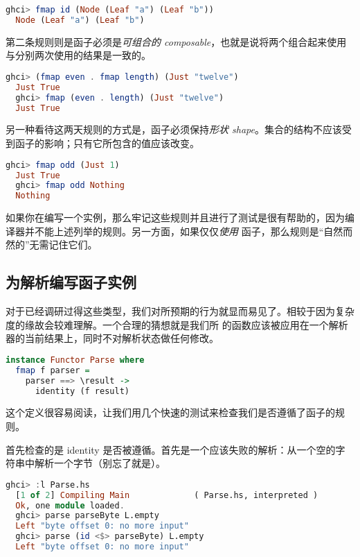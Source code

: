 \documentclass[./main.tex]{subfiles}
\begin{document}
\begin{lstlisting}[language=Haskell]
  ghci> fmap id (Node (Leaf "a") (Leaf "b"))
  Node (Leaf "a") (Leaf "b")
\end{lstlisting}

第二条规则则是函子必须是\textit{可组合的 composable}，也就是说将两个组合起来使用与分别两次使用的结果是一致的。

\begin{lstlisting}[language=Haskell]
  ghci> (fmap even . fmap length) (Just "twelve")
  Just True
  ghci> fmap (even . length) (Just "twelve")
  Just True
\end{lstlisting}

另一种看待这两天规则的方式是，函子必须保持\textit{形状 shape}。集合的结构不应该受到函子的影响；只有它所包含的值应该改变。

\begin{lstlisting}[language=Haskell]
  ghci> fmap odd (Just 1)
  Just True
  ghci> fmap odd Nothing
  Nothing
\end{lstlisting}

如果你在编写一个实例，那么牢记这些规则并且进行了测试是很有帮助的，因为编译器并不能上述列举的规则。另一方面，如果仅仅\textit{使用}
函子，那么规则是“自然而然的”无需记住它们。

\subsection*{为解析编写函子实例}

对于已经调研过得这些类型，我们对所预期的行为就显而易见了。相较于因为复杂度的缘故会较难理解。一个合理的猜想就是我们所
的函数应该被应用在一个解析器的当前结果上，同时不对解析状态做任何修改。

\begin{lstlisting}[language=Haskell]
  instance Functor Parse where
  fmap f parser =
    parser ==> \result ->
      identity (f result)
\end{lstlisting}

这个定义很容易阅读，让我们用几个快速的测试来检查我们是否遵循了函子的规则。

首先检查的是 identity 是否被遵循。首先是一个应该失败的解析：从一个空的字符串中解析一个字节（别忘了\acode{(<\$>)}就是）。

\begin{lstlisting}[language=Haskell]
  ghci> :l Parse.hs
  [1 of 2] Compiling Main             ( Parse.hs, interpreted )
  Ok, one module loaded.
  ghci> parse parseByte L.empty
  Left "byte offset 0: no more input"
  ghci> parse (id <$> parseByte) L.empty
  Left "byte offset 0: no more input"
\end{lstlisting}
\end{document}
